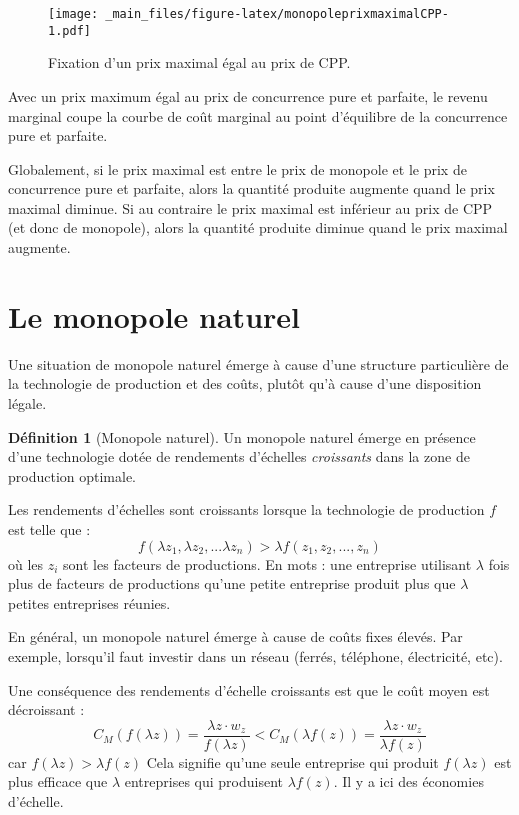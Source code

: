 \documentclass[
  a4paper,
]{book}
\theoremstyle{definition}
\newtheorem{definition}{Définition}[chapter]
\theoremstyle{definition}
\theoremstyle{definition}
\theoremstyle{definition}
\theoremstyle{remark}
\begin{document}
\begin{figure}
\centering
\texttt{[image: \_main\_files/figure-latex/monopoleprixmaximalCPP-1.pdf]}
\caption{\label{fig:monopoleprixmaximalCPP}Fixation d'un prix maximal égal au prix de CPP.}
\end{figure}

Avec un prix maximum égal au prix de concurrence pure et parfaite, le revenu marginal coupe la courbe de coût marginal au point d'équilibre de la concurrence pure et parfaite.

Globalement, si le prix maximal est entre le prix de monopole et le prix de concurrence pure et parfaite, alors la quantité produite augmente quand le prix maximal diminue.
Si au contraire le prix maximal est inférieur au prix de CPP (et donc de monopole), alors la quantité produite diminue quand le prix maximal augmente.

\hypertarget{le-monopole-naturel}{%
\section{Le monopole naturel}\label{le-monopole-naturel}}

Une situation de monopole naturel émerge à cause d'une structure particulière de la technologie de production et des coûts, plutôt qu'à cause d'une disposition légale.

\begin{definition}[Monopole naturel]
Un monopole naturel émerge en présence d'une technologie dotée de rendements d'échelles \emph{croissants} dans la zone de production optimale.
\end{definition}

Les rendements d'échelles sont croissants lorsque la technologie de production \(f\) est telle que :
\[
f(\lambda z_1, \lambda z_2, ...\lambda z_n) > \lambda f(z_1,z_2, ..., z_n)
\]
où les \(z_i\) sont les facteurs de productions.
En mots : une entreprise utilisant \(\lambda\) fois plus de facteurs de productions qu'une petite entreprise produit plus que \(\lambda\) petites entreprises réunies.

En général, un monopole naturel émerge à cause de coûts fixes élevés.
Par exemple, lorsqu'il faut investir dans un réseau (ferrés, téléphone, électricité, etc).

Une conséquence des rendements d'échelle croissants est que le coût moyen est décroissant :
\[
C_M(f(\lambda z)) =\frac{\lambda z\cdot w_z}{f(\lambda z)} < C_M(\lambda f(z)) = \frac{\lambda z\cdot w_z}{\lambda f(z)}
\]
car \(f(\lambda z)>\lambda f(z)\)
Cela signifie qu'une seule entreprise qui produit \(f(\lambda z)\) est plus efficace que \(\lambda\) entreprises qui produisent \(\lambda f(z)\).
Il y a ici des économies d'échelle.
\end{document}
